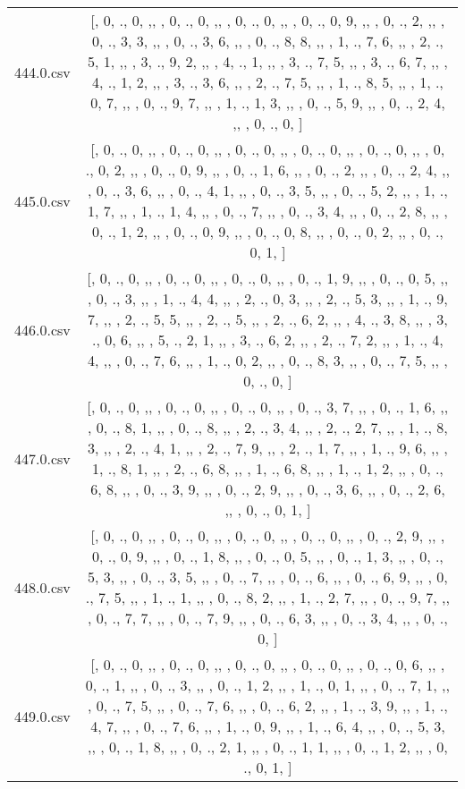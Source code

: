 \begin{table}[ht]
\begin{tabular}{@{}c c@{}}
	444.0.csv & [, 0, ., 0, ,,  , 0, ., 0, ,,  , 0, ., 0, ,,  , 0, ., 0, 9, ,,  , 0, ., 2, ,,  , 0, ., 3, 3, ,,  , 0, ., 3, 6, ,,  , 0, ., 8, 8, ,,  , 1, ., 7, 6, ,,  , 2, ., 5, 1, ,,  , 3, ., 9, 2, ,,  , 4, ., 1, ,,  , 3, ., 7, 5, ,,  , 3, ., 6, 7, ,,  , 4, ., 1, 2, ,,  , 3, ., 3, 6, ,,  , 2, ., 7, 5, ,,  , 1, ., 8, 5, ,,  , 1, ., 0, 7, ,,  , 0, ., 9, 7, ,,  , 1, ., 1, 3, ,,  , 0, ., 5, 9, ,,  , 0, ., 2, 4, ,,  , 0, ., 0, ]\\ 
	445.0.csv & [, 0, ., 0, ,,  , 0, ., 0, ,,  , 0, ., 0, ,,  , 0, ., 0, ,,  , 0, ., 0, ,,  , 0, ., 0, 2, ,,  , 0, ., 0, 9, ,,  , 0, ., 1, 6, ,,  , 0, ., 2, ,,  , 0, ., 2, 4, ,,  , 0, ., 3, 6, ,,  , 0, ., 4, 1, ,,  , 0, ., 3, 5, ,,  , 0, ., 5, 2, ,,  , 1, ., 1, 7, ,,  , 1, ., 1, 4, ,,  , 0, ., 7, ,,  , 0, ., 3, 4, ,,  , 0, ., 2, 8, ,,  , 0, ., 1, 2, ,,  , 0, ., 0, 9, ,,  , 0, ., 0, 8, ,,  , 0, ., 0, 2, ,,  , 0, ., 0, 1, ]\\ 
	446.0.csv & [, 0, ., 0, ,,  , 0, ., 0, ,,  , 0, ., 0, ,,  , 0, ., 1, 9, ,,  , 0, ., 0, 5, ,,  , 0, ., 3, ,,  , 1, ., 4, 4, ,,  , 2, ., 0, 3, ,,  , 2, ., 5, 3, ,,  , 1, ., 9, 7, ,,  , 2, ., 5, 5, ,,  , 2, ., 5, ,,  , 2, ., 6, 2, ,,  , 4, ., 3, 8, ,,  , 3, ., 0, 6, ,,  , 5, ., 2, 1, ,,  , 3, ., 6, 2, ,,  , 2, ., 7, 2, ,,  , 1, ., 4, 4, ,,  , 0, ., 7, 6, ,,  , 1, ., 0, 2, ,,  , 0, ., 8, 3, ,,  , 0, ., 7, 5, ,,  , 0, ., 0, ]\\ 
	447.0.csv & [, 0, ., 0, ,,  , 0, ., 0, ,,  , 0, ., 0, ,,  , 0, ., 3, 7, ,,  , 0, ., 1, 6, ,,  , 0, ., 8, 1, ,,  , 0, ., 8, ,,  , 2, ., 3, 4, ,,  , 2, ., 2, 7, ,,  , 1, ., 8, 3, ,,  , 2, ., 4, 1, ,,  , 2, ., 7, 9, ,,  , 2, ., 1, 7, ,,  , 1, ., 9, 6, ,,  , 1, ., 8, 1, ,,  , 2, ., 6, 8, ,,  , 1, ., 6, 8, ,,  , 1, ., 1, 2, ,,  , 0, ., 6, 8, ,,  , 0, ., 3, 9, ,,  , 0, ., 2, 9, ,,  , 0, ., 3, 6, ,,  , 0, ., 2, 6, ,,  , 0, ., 0, 1, ]\\ 
	448.0.csv & [, 0, ., 0, ,,  , 0, ., 0, ,,  , 0, ., 0, ,,  , 0, ., 0, ,,  , 0, ., 2, 9, ,,  , 0, ., 0, 9, ,,  , 0, ., 1, 8, ,,  , 0, ., 0, 5, ,,  , 0, ., 1, 3, ,,  , 0, ., 5, 3, ,,  , 0, ., 3, 5, ,,  , 0, ., 7, ,,  , 0, ., 6, ,,  , 0, ., 6, 9, ,,  , 0, ., 7, 5, ,,  , 1, ., 1, ,,  , 0, ., 8, 2, ,,  , 1, ., 2, 7, ,,  , 0, ., 9, 7, ,,  , 0, ., 7, 7, ,,  , 0, ., 7, 9, ,,  , 0, ., 6, 3, ,,  , 0, ., 3, 4, ,,  , 0, ., 0, ]\\ 
	449.0.csv & [, 0, ., 0, ,,  , 0, ., 0, ,,  , 0, ., 0, ,,  , 0, ., 0, ,,  , 0, ., 0, 6, ,,  , 0, ., 1, ,,  , 0, ., 3, ,,  , 0, ., 1, 2, ,,  , 1, ., 0, 1, ,,  , 0, ., 7, 1, ,,  , 0, ., 7, 5, ,,  , 0, ., 7, 6, ,,  , 0, ., 6, 2, ,,  , 1, ., 3, 9, ,,  , 1, ., 4, 7, ,,  , 0, ., 7, 6, ,,  , 1, ., 0, 9, ,,  , 1, ., 6, 4, ,,  , 0, ., 5, 3, ,,  , 0, ., 1, 8, ,,  , 0, ., 2, 1, ,,  , 0, ., 1, 1, ,,  , 0, ., 1, 2, ,,  , 0, ., 0, 1, ]\\ 

\end{tabular}
\end{table}
